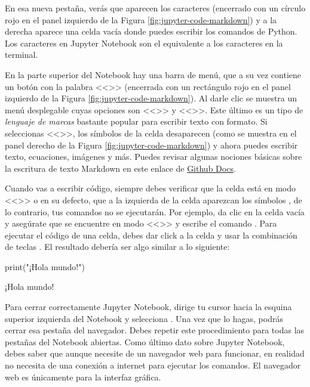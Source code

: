 En esa nueva pestaña, verás que aparecen los caracteres \pynorm{[]:} (encerrado con un círculo rojo en el panel izquierdo de la Figura \ref{fig:jupyter-code-markdown}) y a la derecha aparece una celda vacía donde puedes escribir los comandos de Python. Los caracteres \pynorm{[]:} en Jupyter Notebook son el equivalente a los caracteres \pynorm{>>>} en la terminal. 

En la parte superior del Notebook hay una barra de menú, que a su vez contiene un botón con la palabra <<>> (encerrada con un rectángulo rojo en el panel izquierdo de la Figura \ref{fig:jupyter-code-markdown}). Al darle clic se muestra un menú desplegable cuyas opciones son <<>> y <<>>. Este último es un tipo de \emph{lenguaje de marcas} bastante popular para escribir texto con formato. Si seleccionas <<>>, los símbolos \pynorm{[]:} de la celda desaparecen (como se muestra en el panel derecho de la Figura \ref{fig:jupyter-code-markdown}) y ahora puedes escribir texto, ecuaciones, imágenes y más. Puedes revisar algunas nociones básicas sobre la escritura de texto Markdown en este enlace de \href{https://docs.github.com/en/get-started/writing-on-github/getting-started-with-writing-and-formatting-on-github/basic-writing-and-formatting-syntax}{Github Docs}. 

Cuando vas a escribir código, siempre debes verificar que la celda está en modo <<>> o en su defecto, que a la izquierda de la celda aparezcan los símbolos \pynorm{[]:}, de lo contrario, tus comandos no se ejecutarán. Por ejemplo, da clic en la celda vacía y asegúrate que se encuentre en modo <<>> y escribe el comando . Para ejecutar el código de una celda, debes dar click a la celda y usar la combinación de teclas . El resultado debería ser algo similar a lo siguiente:

\begin{pyin}
print("¡Hola mundo!")
\end{pyin}
\begin{pyprint}
¡Hola mundo!
\end{pyprint}

Para cerrar correctamente Jupyter Notebook, dirige tu cursor hacia la esquina superior izquierda del Notebook y selecciona . Una vez que lo hagas, podrás cerrar esa pestaña del navegador. Debes repetir este procedimiento para todas las pestañas del Notebook abiertas. Como último dato sobre Jupyter Notebook, debes saber que aunque necesite de un navegador web para funcionar, en realidad no necesita de una conexión a internet para ejecutar los comandos. El navegador web es únicamente para la interfaz gráfica.

